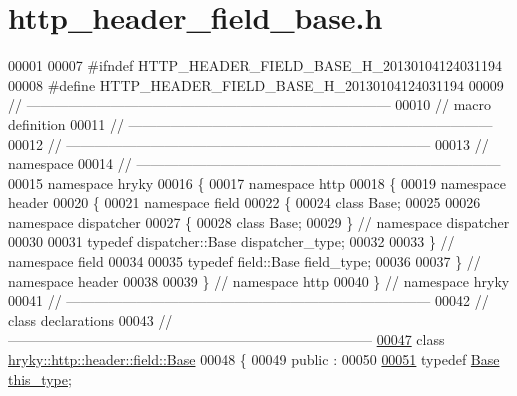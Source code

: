\hypertarget{http__header__field__base_8h_source}{\section{http\-\_\-header\-\_\-field\-\_\-base.\-h}
}

\begin{DoxyCode}
00001 
00007 \textcolor{preprocessor}{#ifndef HTTP\_HEADER\_FIELD\_BASE\_H\_20130104124031194}
00008 \textcolor{preprocessor}{}\textcolor{preprocessor}{#define HTTP\_HEADER\_FIELD\_BASE\_H\_20130104124031194}
00009 \textcolor{preprocessor}{}\textcolor{comment}{//
      ------------------------------------------------------------------------------}
00010 \textcolor{comment}{// macro definition}
00011 \textcolor{comment}{//
      ------------------------------------------------------------------------------}
00012 \textcolor{comment}{//
      ------------------------------------------------------------------------------}
00013 \textcolor{comment}{// namespace}
00014 \textcolor{comment}{//
      ------------------------------------------------------------------------------}
00015 \textcolor{keyword}{namespace }hryky
00016 \{
00017 \textcolor{keyword}{namespace }http
00018 \{
00019 \textcolor{keyword}{namespace }header
00020 \{
00021 \textcolor{keyword}{namespace }field
00022 \{
00024     \textcolor{keyword}{class }Base;
00025 
00026 \textcolor{keyword}{namespace }dispatcher
00027 \{
00028     \textcolor{keyword}{class }Base;
00029 \} \textcolor{comment}{// namespace dispatcher}
00030 
00031 \textcolor{keyword}{typedef} dispatcher::Base dispatcher\_type;
00032 
00033 \} \textcolor{comment}{// namespace field}
00034 
00035 \textcolor{keyword}{typedef} field::Base field\_type;
00036 
00037 \} \textcolor{comment}{// namespace header}
00038 
00039 \} \textcolor{comment}{// namespace http}
00040 \} \textcolor{comment}{// namespace hryky}
00041 \textcolor{comment}{//
      ------------------------------------------------------------------------------}
00042 \textcolor{comment}{// class declarations}
00043 \textcolor{comment}{//
      ------------------------------------------------------------------------------}
\hypertarget{http__header__field__base_8h_source_l00047}{}\hyperlink{classhryky_1_1http_1_1header_1_1field_1_1_base}{00047} \textcolor{comment}{}\textcolor{keyword}{class }\hyperlink{classhryky_1_1http_1_1header_1_1field_1_1_base}{hryky::http::header::field::Base}
00048 \{
00049 \textcolor{keyword}{public} :
00050 
\hypertarget{http__header__field__base_8h_source_l00051}{}\hyperlink{classhryky_1_1http_1_1header_1_1field_1_1_base_ac62199121ede1697541768c2e79f5470}{00051}     \textcolor{keyword}{typedef} \hyperlink{classhryky_1_1http_1_1header_1_1field_1_1_base}{Base} \hyperlink{classhryky_1_1http_1_1header_1_1field_1_1_base_ac62199121ede1697541768c2e79f5470}{this_type};

\end{DoxyCode}
